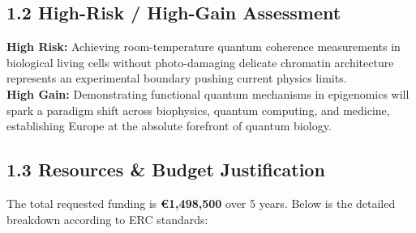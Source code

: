 \documentclass[11pt,a4paper]{article}
\begin{document}
\subsection*{1.2 High-Risk / High-Gain Assessment}
\begin{tcolorbox}[ercbox, title={\faExclamationTriangle\ High-Risk / High-Gain Balance}]
  \textbf{High Risk:} Achieving room-temperature quantum coherence measurements in biological living cells without photo-damaging delicate chromatin architecture represents an experimental boundary pushing current physics limits.
  \\[4pt]
  \textbf{High Gain:} Demonstrating functional quantum mechanisms in epigenomics will spark a paradigm shift across biophysics, quantum computing, and medicine, establishing Europe at the absolute forefront of quantum biology.
\end{tcolorbox}

\subsection*{1.3 Resources \& Budget Justification}
The total requested funding is \textbf{\euro 1,498,500} over 5 years. Below is the detailed breakdown according to ERC standards:
\end{document}
